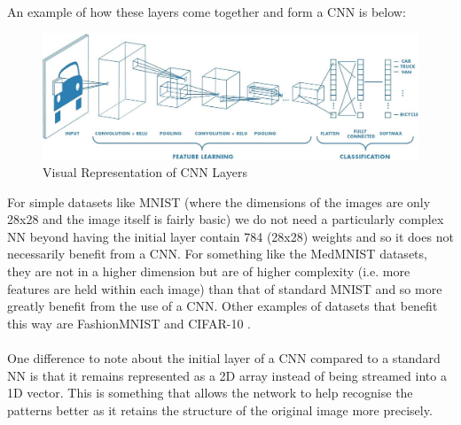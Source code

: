 An example of how these layers come together and form a CNN is below:
\begin{figure}[htbp]
	\centering
    \includegraphics[scale=0.3]{background/cnn_example.jpeg}
    \caption{Visual Representation of CNN Layers \cite{eli5_convnet}}
    \label{fig:cnn-layers}
\end{figure}

For simple datasets like MNIST (where the dimensions of the images are only 28x28 and the image itself is fairly basic) we do not need a particularly complex NN beyond having the initial layer contain 784 (28x28) weights and so it does not necessarily benefit from a CNN. 
For something like the MedMNIST \cite{medmnist} datasets, they are not in a higher dimension but are of higher complexity (i.e. more features are held within each image) than that of standard MNIST and so more greatly benefit from the use of a CNN. 
Other examples of datasets that benefit this way are FashionMNIST \cite{fashion} and CIFAR-10 \cite{cifar}.
\\ \\
One difference to note about the initial layer of a CNN compared to a standard NN is that it remains represented as a 2D array instead of being streamed into a 1D vector. 
This is something that allows the network to help recognise the patterns better as it retains the structure of the original image more precisely.
